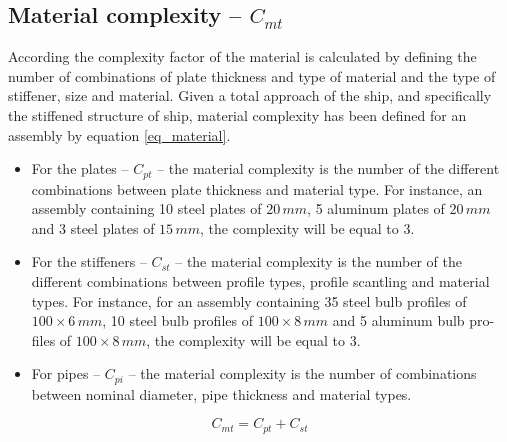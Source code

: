\subsection{Material complexity -- $C_{mt}$}
According \cite{Rigterink2013} the complexity factor of the material is calculated by defining the number of combinations of plate thickness and type of material and the type of stiffener, size and material. 
Given a total approach of the ship, and specifically  the stiffened structure of ship, material complexity has been defined for an assembly by equation \ref{eq_material}.


\begin{itemize}
\item For the plates -- $C_{pt}$ -- the material complexity is the number of the different combinations between plate thickness and material type. For instance, an assembly containing 10 steel plates of $20 \, mm$, 5 aluminum plates of $20 \, mm$ and 3 steel plates of $15 \, mm$, the complexity will be equal to 3.
\item For the stiffeners -- $C_{st}$ -- the material complexity is the number of the different combinations between profile types, profile scantling and material types. For instance, for an assembly containing 35 steel bulb profiles of $100 \times 6 \, mm$, 10 steel bulb profiles of $100 \times 8 \, mm$ and 5 aluminum bulb pro-files of $100 \times 8 \, mm$, the complexity will be equal to 3.
\item For pipes -- $C_{pi}$ -- the material complexity is the number of combinations between nominal diameter, pipe thickness and material types.
\end{itemize}


\begin{equation}
\label{eq_material}
C_{mt} = C_{pt}+C_{st}
\end{equation}


	
